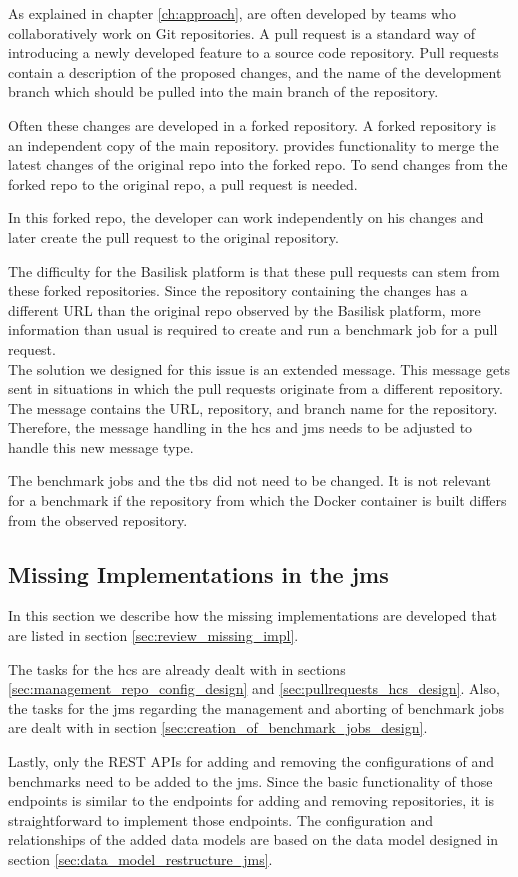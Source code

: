 As explained in chapter \ref{ch:approach}, \tsp{} are often developed by teams who collaboratively work on Git repositories.
A pull request is a standard way of introducing a newly developed feature to a source code repository.
Pull requests contain a description of the proposed changes, and the name of the development branch which should be pulled into the main branch of the repository.

Often these changes are developed in a forked repository.
A forked repository is an independent copy of the main repository.
\gh{} provides functionality to merge the latest changes of the original repo into the forked repo.
To send changes from the forked repo to the original repo, a pull request is needed.

In this forked repo, the developer can work independently on his changes and later create the pull request to the original repository.

The difficulty for the Basilisk platform is that these pull requests can stem from these forked repositories.
Since the repository containing the changes has a different URL than the original repo observed by the Basilisk platform, more information than usual is required to create and run a benchmark job for a pull request.
\\

The solution we designed for this issue is an extended message.
This message gets sent in situations in which the pull requests originate from a different repository.
The message contains the URL, repository, and branch name for the \gh{} repository.
Therefore, the message handling in the \ac{hcs} and \ac{jms} needs to be adjusted to handle this new message type.

The benchmark jobs and the \acl{tbs} did not need to be changed.
It is not relevant for a benchmark if the repository from which the Docker container is built differs from the observed repository.


\subsection{Missing Implementations in the \acl{jms}}
In this section we describe how the missing implementations are developed that are listed in section \ref{sec:review_missing_impl}.

The tasks for the \ac{hcs} are already dealt with in sections \ref{sec:management_repo_config_design} and \ref{sec:pullrequests_hcs_design}.
Also, the tasks for the \ac{jms} regarding the management and aborting of benchmark jobs are dealt with in section \ref{sec:creation_of_benchmark_jobs_design}.

Lastly, only the REST APIs for adding and removing the configurations of \tsp{} and benchmarks need to be added to the \ac{jms}.
Since the basic functionality of those endpoints is similar to the endpoints for adding and removing repositories, it is straightforward to implement those endpoints.
The configuration and relationships of the added data models are based on the data model designed in section \ref{sec:data_model_restructure_jms}.



